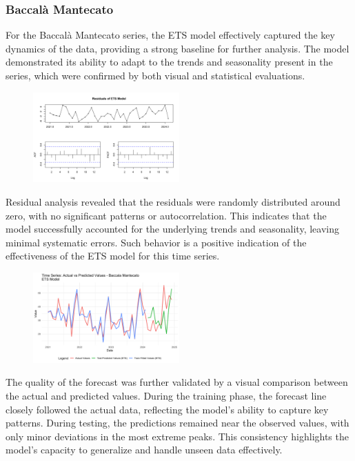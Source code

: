 \documentclass[10pt,twocolumn,letterpaper]{article}
\begin{document}
\subsubsection{Baccalà Mantecato}
For the Baccalà Mantecato series, the ETS model effectively captured the key dynamics of the data, providing a strong baseline for further analysis. The model demonstrated its ability to adapt to the trends and seasonality present in the series, which were confirmed by both visual and statistical evaluations.
\begin{figure}[H]
    \centering
    \includegraphics[width=0.5\textwidth]{PlotsBEFD/Residuals_ETS_M.png} 
    \caption{}
    \label{fig:esempio}
\end{figure}
Residual analysis revealed that the residuals were randomly distributed around zero, with no significant patterns or autocorrelation. This indicates that the model successfully accounted for the underlying trends and seasonality, leaving minimal systematic errors. Such behavior is a positive indication of the effectiveness of the ETS model for this time series.
\begin{figure}[H]
    \centering
    \includegraphics[width=0.5\textwidth]{PlotsBEFD/TS_M_ETS.png} 
    \caption{}
    \label{fig:esempio}
\end{figure}
The quality of the forecast was further validated by a visual comparison between the actual and predicted values. During the training phase, the forecast line closely followed the actual data, reflecting the model's ability to capture key patterns. During testing, the predictions remained near the observed values, with only minor deviations in the most extreme peaks. This consistency highlights the model's capacity to generalize and handle unseen data effectively.
\end{document}
